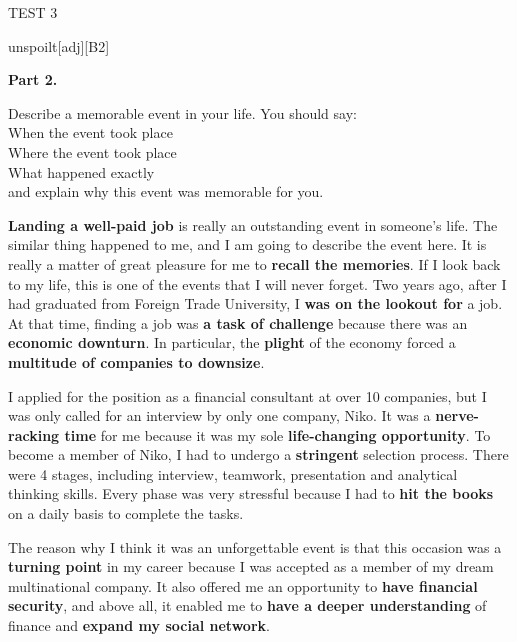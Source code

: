 \documentclass[a4paper,12pt]{article}
\begin{document}
\begin{glossarymc}[Cambridge 3]
\begin{test}{TEST 3}
\begin{VocabExplain}[Part 1]
\begin{ExplainCard}{unspoilt}[adj][B2]
\end{ExplainCard}


\end{VocabExplain}
\textbf{Part 2.}

\begin{qa}{Describe a memorable event in your life. You should say: 
\\ When the event took place 
\\ Where the event took place 
\\ What happened exactly 
\\ and explain why this event was memorable for you.}

\textbf{Landing a well-paid job} is really an outstanding event in someone's life. The similar thing happened to me, and I am going to describe the event here. It is really a matter of great pleasure for me to \textbf{recall the memories}. If I look back to my life, this is one of the events that I will never forget. Two years ago, after I had graduated from Foreign Trade University, I \textbf{was on the lookout for} a job. At that time, finding a job was \textbf{a task of challenge} because there was an \textbf{economic downturn}. In particular, the \textbf{plight} of the economy forced a \textbf{multitude of companies to downsize}. 

I applied for the position as a financial consultant at over 10 companies, but I was only called for an interview by only one company, Niko. It was a \textbf{nerve-racking time} for me because it was my sole \textbf{life-changing opportunity}. To become a member of Niko, I had to undergo a \textbf{stringent} selection process. There were 4 stages, including interview, teamwork, presentation and analytical thinking skills. Every phase was very stressful because I had to \textbf{hit the books} on a daily basis to complete the tasks. 

The reason why I think it was an unforgettable event is that this occasion was a \textbf{turning point} in my career because I was accepted as a member of my dream multinational company. It also offered me an opportunity to \textbf{have financial security}, and above all, it enabled me to \textbf{have a deeper understanding} of finance and \textbf{expand my social network}.
\end{qa}



\end{test}
\end{glossarymc}
\end{document}
